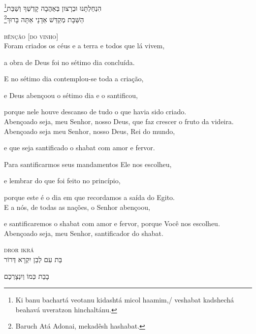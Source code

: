 \footnote{Ki banu bachartá veotanu kidashtá micol haamim,/ veshabat kadshechá beahavá uveratzon hinchaltánu.}הִנְחַלְתָּנוּ וּבְרָצון בְּאַהֲבָה קָדְשְׁךָ וְשַׁבַּת \\[10pt]


\footnote{Baruch Atá Adonai, mekadêsh hashabat.}הַשַּׁבָּת מְקַדֵּשׁ אַדָנָי אַתָּה בָּרוּךְ

\movetooddpage
\raggedright

\vspace*{1cm}

\textsc{bênção [do vinho]}\\[15pt]

Foram criados os céus e a terra e todos que lá vivem,

a obra de Deus foi no sétimo dia concluída.

E no sétimo dia contemplou-se toda a criação,

e Deus abençoou o sétimo dia e o santificou,

porque nele houve descanso de tudo o que havia sido criado.\\[10pt]

Abençoado seja, meu Senhor, nosso Deus, que faz crescer o fruto da \qb{}videira.\\[10pt]

Abençoado seja meu Senhor, nosso Deus, Rei do mundo,

e que seja santificado o shabat com amor e fervor.

Para santificarmos seus mandamentos Ele nos escolheu,

e lembrar do que foi feito no princípio,

porque este é o dia em que recordamos a saída do Egito.\\[10pt]

E a nós, de todas as nações, o Senhor abençoou,

e santificaremos o shabat com amor e fervor, porque Você nos \qb{}escolheu.\\[10pt]


Abençoado seja, meu Senhor, santificador do shabat.


\movetoevenpage
\raggedleft
{}

\vspace*{1cm}

\textsc{dror ikrá}\\[15pt]


בַּת עִם לְבֵן יִקְרָא דְּרוֹר

בָבַת כְּמוֹ וְיִנְצָרְכֶם


